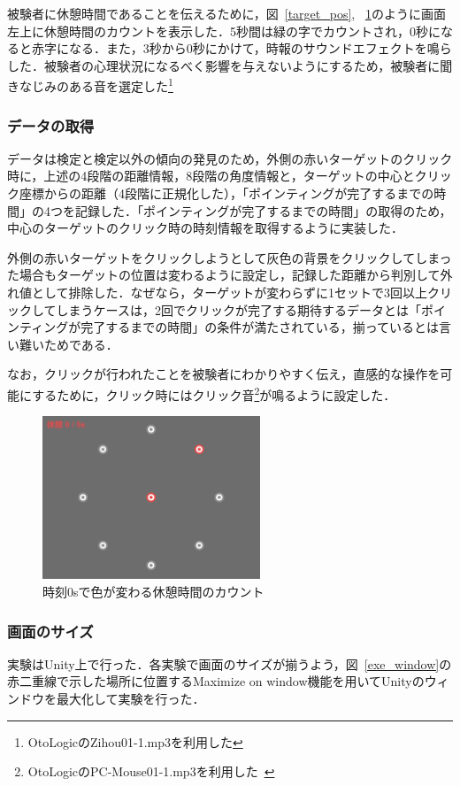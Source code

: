 \documentclass[a4paper, papersize, titlepage]{jsarticle}
\begin{document}
\begin{multicols}{2}
被験者に休憩時間であることを伝えるために，図~\ref{target_pos}, ~\ref{breaktime}のように画面左上に休憩時間のカウントを表示した．5秒間は緑の字でカウントされ，0秒になると赤字になる．また，3秒から0秒にかけて，時報のサウンドエフェクトを鳴らした．被験者の心理状況になるべく影響を与えないようにするため，被験者に聞きなじみのある音を選定した\footnote{OtoLogicのZihou01-1.mp3を利用した\cite{zihou_bib}}


\subsubsection{データの取得}
データは検定と検定以外の傾向の発見のため，外側の赤いターゲットのクリック時に，上述の4段階の距離情報，8段階の角度情報と，ターゲットの中心とクリック座標からの距離（4段階に正規化した），「ポインティングが完了するまでの時間」の4つを記録した．「ポインティングが完了するまでの時間」の取得のため，中心のターゲットのクリック時の時刻情報を取得するように実装した．

外側の赤いターゲットをクリックしようとして灰色の背景をクリックしてしまった場合もターゲットの位置は変わるように設定し，記録した距離から判別して外れ値として排除した．なぜなら，ターゲットが変わらずに1セットで3回以上クリックしてしまうケースは，2回でクリックが完了する期待するデータとは「ポインティングが完了するまでの時間」の条件が満たされている，揃っているとは言い難いためである．

なお，クリックが行われたことを被験者にわかりやすく伝え，直感的な操作を可能にするために，クリック時にはクリック音\footnote{OtoLogicのPC-Mouse01-1.mp3を利用した~\cite{click_bib}}が鳴るように設定した．


\begin{figure}[H]
 \centering
   \includegraphics[width=65mm]{breaktime.png}
 \caption{時刻0sで色が変わる休憩時間のカウント}
 \label{breaktime}
\end{figure}
\noindent

\subsubsection{画面のサイズ}
実験はUnity上で行った．各実験で画面のサイズが揃うよう，図~\ref{exe_window}の赤二重線で示した場所に位置するMaximize on window機能を用いてUnityのウィンドウを最大化して実験を行った．


\end{multicols}
\end{document}
